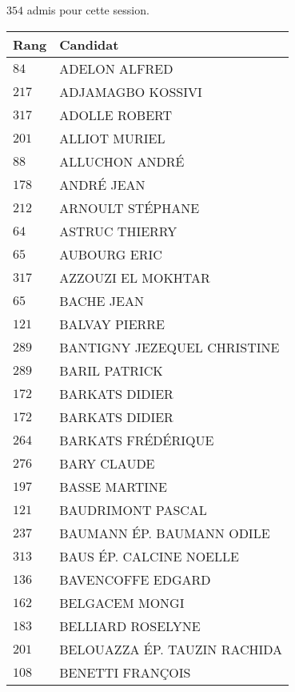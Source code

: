 



  $354$ admis pour cette session.

  \begin{xltabular}{\linewidth}{|l|X|}
    \hline
    \textbf{Rang} & \textbf{Candidat} \\
    \hline
    $84$ & ADELON ALFRED \\
    \hline
    $217$ & ADJAMAGBO KOSSIVI \\
    \hline
    $317$ & ADOLLE ROBERT \\
    \hline
    $201$ & ALLIOT MURIEL \\
    \hline
    $88$ & ALLUCHON ANDRÉ \\
    \hline
    $178$ & ANDRÉ JEAN \\
    \hline
    $212$ & ARNOULT STÉPHANE \\
    \hline
    $64$ & ASTRUC THIERRY \\
    \hline
    $65$ & AUBOURG ERIC \\
    \hline
    $317$ & AZZOUZI EL MOKHTAR \\
    \hline
    $65$ & BACHE JEAN \\
    \hline
    $121$ & BALVAY PIERRE \\
    \hline
    $289$ & BANTIGNY JEZEQUEL CHRISTINE \\
    \hline
    $289$ & BARIL PATRICK \\
    \hline
    $172$ & BARKATS DIDIER \\
    \hline
    $172$ & BARKATS DIDIER \\
    \hline
    $264$ & BARKATS FRÉDÉRIQUE \\
    \hline
    $276$ & BARY CLAUDE \\
    \hline
    $197$ & BASSE MARTINE \\
    \hline
    $121$ & BAUDRIMONT PASCAL \\
    \hline
    $237$ & BAUMANN ÉP. BAUMANN ODILE \\
    \hline
    $313$ & BAUS ÉP. CALCINE NOELLE \\
    \hline
    $136$ & BAVENCOFFE EDGARD \\
    \hline
    $162$ & BELGACEM MONGI \\
    \hline
    $183$ & BELLIARD ROSELYNE \\
    \hline
    $201$ & BELOUAZZA ÉP. TAUZIN RACHIDA \\
    \hline
    $108$ & BENETTI FRANÇOIS \\

\end{xltabular}
